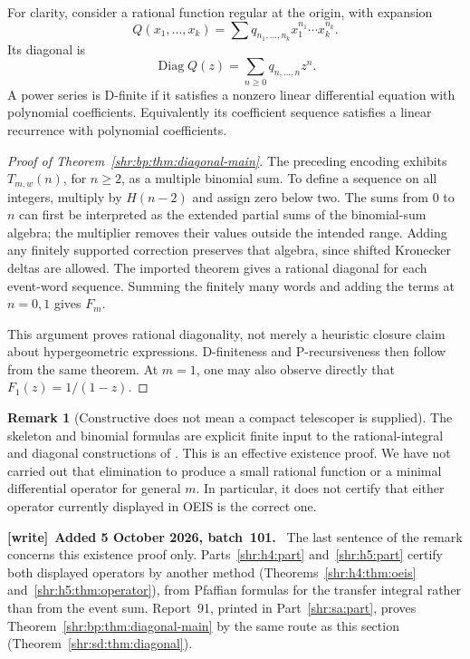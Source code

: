 \documentclass[11pt,letterpaper]{article}
\numberwithin{equation}{section}
\theoremstyle{definition}
\newtheorem{remark}[theorem]{Remark}
\newcommand{\1}{\mathbf 1}
\newcommand{\Diag}{\operatorname{Diag}}
\newenvironment{writenote}[1][]{\par\smallskip\begingroup\small
 \noindent\textbf{[write]}\if\relax\detokenize{#1}\relax\else~\textbf{#1.}\fi\ }%
 {\par\endgroup\smallskip}
\begin{document}
For clarity, consider a rational function regular at the origin, with
expansion
\[
 Q(x_1,\ldots,x_k)=\sum q_{n_1,\ldots,n_k}x_1^{n_1}\cdots x_k^{n_k}.
\]
Its diagonal is
\[
 \Diag Q(z)=\sum_{n\ge0}q_{n,\ldots,n}z^n.
\]
A power series is D-finite if it satisfies a nonzero linear differential
equation with polynomial coefficients. Equivalently its coefficient
sequence satisfies a linear recurrence with polynomial coefficients.

\begin{proof}[Proof of Theorem~\ref{shr:bp:thm:diagonal-main}]
The preceding encoding exhibits $T_{m,w}(n)$, for $n\ge2$, as a multiple
binomial sum. To define a sequence on all integers, multiply by $H(n-2)$
and assign zero below two. The sums from $0$ to $n$ can first be interpreted
as the extended partial sums of the binomial-sum algebra; the multiplier
removes their values outside the intended range. Adding any finitely
supported correction preserves that algebra, since shifted Kronecker
deltas are allowed. The imported theorem gives a rational diagonal for
each event-word sequence. Summing the finitely many words and adding the
terms at $n=0,1$ gives $F_m$.

This argument proves rational diagonality, not merely a heuristic closure
claim about hypergeometric expressions. D-finiteness and P-recursiveness
then follow from the same theorem. At $m=1$, one may also observe directly
that $F_1(z)=1/(1-z)$.
\end{proof}

\begin{remark}[Constructive does not mean a compact telescoper is supplied]
\label{shr:bp:rem:constructive}
The skeleton and binomial formulas are explicit finite input to the
rational-integral and diagonal constructions of \cite{BLS}. This is an
effective existence proof. We have not carried out that elimination to
produce a small rational function or a minimal differential operator for
general $m$. In particular, it does not certify that either operator
currently displayed in OEIS is the correct one.
\end{remark}

\begin{writenote}[Added 5 October 2026, batch~101]
The last sentence of the remark concerns this existence proof only.
Parts~\ref{shr:h4:part} and~\ref{shr:h5:part} certify both displayed
operators by another method (Theorems~\ref{shr:h4:thm:oeis}
and~\ref{shr:h5:thm:operator}), from Pfaffian formulas for the transfer
integral rather than from the event sum. Report~91, printed in
Part~\ref{shr:sa:part}, proves Theorem~\ref{shr:bp:thm:diagonal-main} by the
same route as this section (Theorem~\ref{shr:sd:thm:diagonal}).
\end{writenote}
\end{document}
